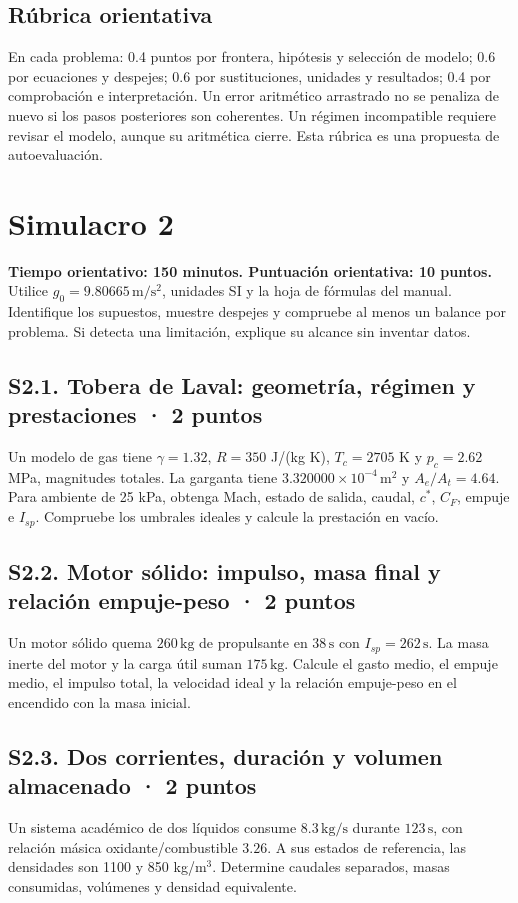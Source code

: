 \section{Rúbrica orientativa} En cada problema: 0.4 puntos por frontera, hipótesis y selección de modelo; 0.6 por ecuaciones y despejes; 0.6 por sustituciones, unidades y resultados; 0.4 por comprobación e interpretación. Un error aritmético arrastrado no se penaliza de nuevo si los pasos posteriores son coherentes. Un régimen incompatible requiere revisar el modelo, aunque su aritmética cierre. Esta rúbrica es una propuesta de autoevaluación.
\chapter{Simulacro 2}
\textbf{Tiempo orientativo: 150 minutos. Puntuación orientativa: 10 puntos.} Utilice $g_0=9.80665\,\mathrm{m/s^2}$, unidades SI y la hoja de fórmulas del manual. Identifique los supuestos, muestre despejes y compruebe al menos un balance por problema. Si detecta una limitación, explique su alcance sin inventar datos.
\section{S2.1. Tobera de Laval: geometría, régimen y prestaciones · 2 puntos}
Un modelo de gas tiene $\gamma=1.32$, $R=350$ J/(kg K), $T_c=2705$ K y $p_c=2.62$ MPa, magnitudes totales. La garganta tiene $3.320000\times10^{-4}\,\mathrm{m^2}$ y $A_e/A_t=4.64$. Para ambiente de 25 kPa, obtenga Mach, estado de salida, caudal, $c^*$, $C_F$, empuje e $I_{sp}$. Compruebe los umbrales ideales y calcule la prestación en vacío.

\section{S2.2. Motor sólido: impulso, masa final y relación empuje-peso · 2 puntos}
Un motor sólido quema $260\,\mathrm{kg}$ de propulsante en $38\,\mathrm s$ con $I_{sp}=262\,\mathrm s$. La masa inerte del motor y la carga útil suman $175\,\mathrm{kg}$. Calcule el gasto medio, el empuje medio, el impulso total, la velocidad ideal y la relación empuje-peso en el encendido con la masa inicial.

\section{S2.3. Dos corrientes, duración y volumen almacenado · 2 puntos}
Un sistema académico de dos líquidos consume $8.3\,\mathrm{kg/s}$ durante $123\,\mathrm{s}$, con relación másica oxidante/combustible $3.26$. A sus estados de referencia, las densidades son 1100 y 850 kg/m$^3$. Determine caudales separados, masas consumidas, volúmenes y densidad equivalente.

